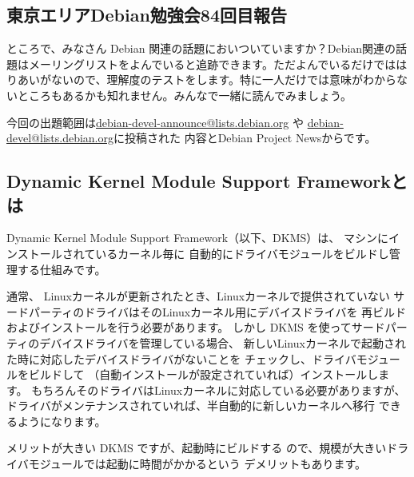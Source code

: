 \documentclass[mingoth,a4paper]{jsarticle}
\begin{document}
\subsection{東京エリアDebian勉強会84回目報告}





ところで、みなさん Debian 関連の話題においついていますか？Debian関連の話
題はメーリングリストをよんでいると追跡できます。ただよんでいるだけではは
りあいがないので、理解度のテストをします。特に一人だけでは意味がわからな
いところもあるかも知れません。みんなで一緒に読んでみましょう。

今回の出題範囲は\url{debian-devel-announce@lists.debian.org} や \url{debian-devel@lists.debian.org}に投稿された
内容とDebian Project Newsからです。

\begin{multicols}{2}
% 
\end{multicols}


\subsection{Dynamic Kernel Module Support Frameworkとは}

Dynamic Kernel Module Support Framework（以下、DKMS）は、
マシンにインストールされているカーネル毎に
自動的にドライバモジュールをビルドし管理する仕組みです。

通常、
Linuxカーネルが更新されたとき、Linuxカーネルで提供されていない
サードパーティのドライバはそのLinuxカーネル用にデバイスドライバを
再ビルドおよびインストールを行う必要があります。
しかし DKMS を使ってサードパーティのデバイスドライバを管理している場合、
新しいLinuxカーネルで起動された時に対応したデバイスドライバがないことを
チェックし、ドライバモジュールをビルドして
（自動インストールが設定されていれば）インストールします。
もちろんそのドライバはLinuxカーネルに対応している必要がありますが、
ドライバがメンテナンスされていれば、半自動的に新しいカーネルへ移行
できるようになります。

メリットが大きい DKMS ですが、起動時にビルドする
ので、規模が大きいドライバモジュールでは起動に時間がかかるという
デメリットもあります。
\fi
\end{document}
